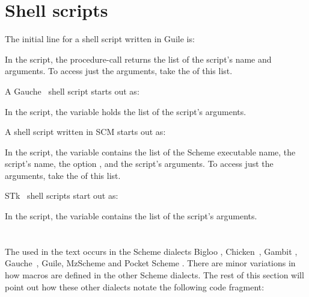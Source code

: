 \iffalse
Note, however, that for the purposes of this text, you
don’t need to insert code into \p{~/.mzschemerc},
since we don’t use any nonstandard Scheme feature not
already defined in MzScheme.
\fi


\section{Shell scripts}

The initial line for a shell script written in Guile is:


In the script, the procedure-call  returns
the list of the script’s name and arguments.  To access
just the arguments, take the  of this list.

A Gauche~\cite{gauche} shell script starts out as:


In the script, the variable  holds
the list of the script’s arguments.

A shell script written in SCM starts out as:


In the script, the variable  contains
the list of the Scheme executable name, the script’s
name, the option , and the script’s arguments.
To
access just the arguments, take the  of this list.

STk~\cite{stk} shell scripts start out as:


In the script, the variable  contains
the list of the script’s arguments.


\section{}
\label{dialect-macro}

The  used in the text occurs in
the Scheme dialects Bigloo \cite{bigloo},
Chicken~\cite{chicken}, Gambit
\cite{gambit}, Gauche~\cite{gauche}, Guile, MzScheme and Pocket Scheme
\cite{pocketscheme}.  There are minor variations in
how macros are defined in the other Scheme dialects.
The rest of this section will point out how these
other dialects notate the following code fragment:

